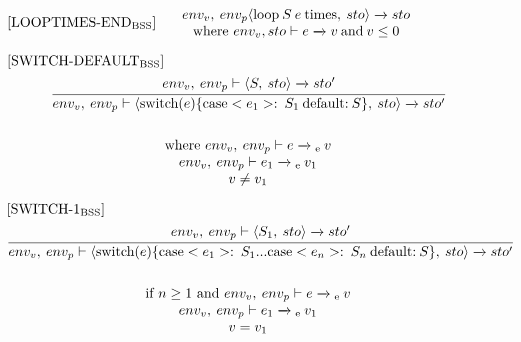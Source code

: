 \begin{equation}
\begin{minipage}{.2\linewidth}
$[\text{LOOPTIMES-END}_\text{BSS}]$
\end{minipage}
\begin{minipage}{.8\linewidth}
\centering
$env_v, \: env_p \langle \text{loop} \: S \: e \: \text{times}, \: sto \rangle \xrightarrow{} sto$ 
\\
where $env_v, sto \vdash e \xrightarrow{} v \: \text{and} \: v \leq 0$
\end{minipage}
\end{equation}

\begin{equation}
\begin{split}
\begin{minipage}{\linewidth}
$[\text{SWITCH-DEFAULT}_\text{BSS}]$
\end{minipage}
\\
\begin{minipage}{\linewidth}
\centering
$\cfrac{env_v, \: env_p \vdash \langle S, \: sto \rangle \xrightarrow{} sto'}{env_v, \: env_p \vdash \langle \text{switch}(e) \{\text{case} <e_1>: \: S_1  \: \text{default:} \: S\}, \: sto \rangle \xrightarrow{} sto' }$ 
\end{minipage}
\\\\
\begin{minipage}{\linewidth}
\centering
where $env_v, \: env_p \vdash e \xrightarrow{}\textsubscript{e} \: v$
\\
$env_v, \: env_p \vdash e_1 \xrightarrow{}\textsubscript{e} \: v_1$
\\
$v \neq v_1$
\end{minipage}
\end{split}
\end{equation}

\begin{equation}
\begin{split}
\begin{minipage}{\linewidth}
$[\text{SWITCH-1}_\text{BSS}]$
\end{minipage}
\\
\begin{minipage}{\linewidth}
\centering
$\cfrac
{
    env_v, \: env_p \vdash \langle S_1, \: sto \rangle \xrightarrow{} sto'
}
{
   env_v, \: env_p \vdash \langle \text{switch}(e) \{\text{case} <e_1>: \: S_1 ... \text{case} <e_n>: \: S_n \: \text{default:} \: S\}, \: sto \rangle \xrightarrow{} sto' 
}
$ 
\end{minipage}
\\\\
\begin{minipage}{\linewidth}
\centering
if $ n \geq 1$ and $env_v, \: env_p \vdash e \xrightarrow{}\textsubscript{e} \: v$
\\
$env_v, \: env_p \vdash e_1 \xrightarrow{}\textsubscript{e} \: v_1$
\\
$v = v_1$
\end{minipage}
\end{split}
\end{equation}

